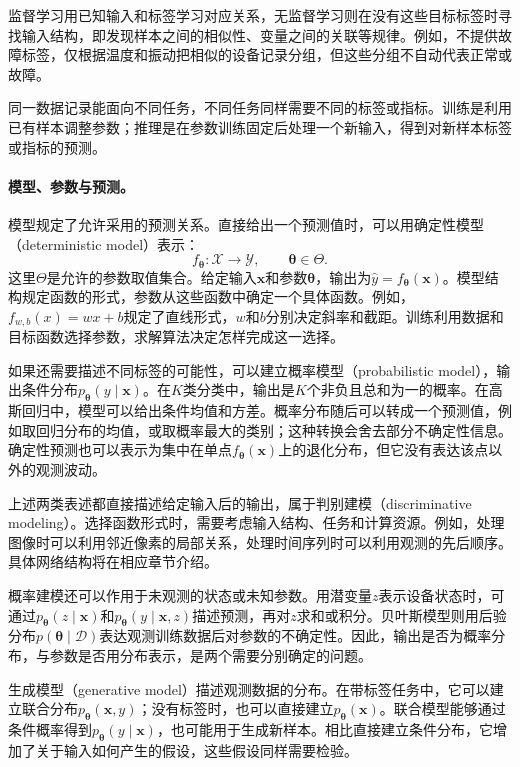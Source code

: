 监督学习用已知输入和标签学习对应关系，无监督学习则在没有这些目标标签时寻找输入结构，即发现样本之间的相似性、变量之间的关联等规律。例如，不提供故障标签，仅根据温度和振动把相似的设备记录分组，但这些分组不自动代表正常或故障。

同一数据记录能面向不同任务，不同任务同样需要不同的标签或指标。训练是利用已有样本调整参数；推理是在参数训练固定后处理一个新输入，得到对新样本标签或指标的预测。


\paragraph{模型、参数与预测。}
模型规定了允许采用的预测关系。直接给出一个预测值时，可以用确定性模型（deterministic model）表示：
\begin{equation}
 f_{\bm{\theta}}:\mathcal{X}\rightarrow\mathcal{Y},
 \qquad \bm{\theta}\in\Theta.
\end{equation}
这里$\Theta$是允许的参数取值集合。给定输入$\bm{x}$和参数$\bm\theta$，输出为$\hat y=f_{\bm\theta}(\bm x)$。模型结构规定函数的形式，参数从这些函数中确定一个具体函数。例如，$f_{w,b}(x)=wx+b$规定了直线形式，$w$和$b$分别决定斜率和截距。训练利用数据和目标函数选择参数，求解算法决定怎样完成这一选择。

如果还需要描述不同标签的可能性，可以建立概率模型（probabilistic model），输出条件分布$p_{\bm\theta}(y\mid\bm x)$。在$K$类分类中，输出是$K$个非负且总和为一的概率。在高斯回归中，模型可以给出条件均值和方差。概率分布随后可以转成一个预测值，例如取回归分布的均值，或取概率最大的类别；这种转换会舍去部分不确定性信息。确定性预测也可以表示为集中在单点$f_{\bm\theta}(\bm x)$上的退化分布，但它没有表达该点以外的观测波动。

上述两类表述都直接描述给定输入后的输出，属于判别建模（discriminative modeling）。选择函数形式时，需要考虑输入结构、任务和计算资源。例如，处理图像时可以利用邻近像素的局部关系，处理时间序列时可以利用观测的先后顺序。具体网络结构将在相应章节介绍。

概率建模还可以作用于未观测的状态或未知参数。用潜变量$z$表示设备状态时，可通过$p_{\bm\theta}(z\mid\bm x)$和$p_{\bm\theta}(y\mid\bm x,z)$描述预测，再对$z$求和或积分。贝叶斯模型则用后验分布$p(\bm\theta\mid\mathcal D)$表达观测训练数据后对参数的不确定性。因此，输出是否为概率分布，与参数是否用分布表示，是两个需要分别确定的问题。

生成模型（generative model）描述观测数据的分布。在带标签任务中，它可以建立联合分布$p_{\bm\theta}(\bm x,y)$；没有标签时，也可以直接建立$p_{\bm\theta}(\bm x)$。联合模型能够通过条件概率得到$p_{\bm\theta}(y\mid\bm x)$，也可能用于生成新样本。相比直接建立条件分布，它增加了关于输入如何产生的假设，这些假设同样需要检验。

